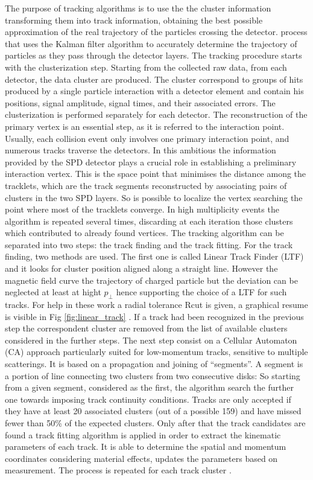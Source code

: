 \documentclass[12pt,a4paper]{book}
\begin{document}
	The purpose of tracking algorithms \cite{Cheng:2908766} is to use the the cluster information transforming them into track information, obtaining the best possible approximation of the real trajectory of the particles crossing the detector. process that uses the Kalman filter algorithm to accurately determine the trajectory of particles as they pass through the detector layers. The tracking procedure starts with the clusterization step. Starting from the collected raw data, from each detector, the data cluster are produced. The cluster correspond to groups of hits produced by a single particle interaction with a detector element and contain his positions, signal amplitude, signal times, and their associated errors. The clusterization is performed separately for each detector. The reconstruction of the primary vertex is an essential step, as it is referred to the interaction point. Usually, each collision event only involves one primary interaction point, and numerous tracks traverse the detectors. In this ambitious the information provided by the SPD detector plays a crucial role in establishing a preliminary interaction vertex. This is the space point that minimises the distance among the tracklets, which are the track segments reconstructed by associating pairs of clusters in the two SPD layers. So is possible to localize the vertex searching  the point where most of the tracklets converge. In high multiplicity events the algorithm is repeated several times, discarding at each iteration those clusters which contributed to already found vertices. The tracking algorithm can be separated into two steps: the track finding and the track fitting. For the track finding, two methods are used. The first one is called Linear Track Finder (LTF) and it looks for cluster position aligned along a straight line. However the magnetic field curve the trajectory of charged particle but the deviation can be neglected at least at hight $p_\perp$ hence supporting the choice of a LTF for such tracks. For help in these work a radial tolerance Rcut is given, a graphical resume is visible in Fig \ref{fig:linear_track} . If a track had been recognized in the previous step the correspondent cluster are removed from the list of available clusters considered in the further steps. The next step consist on a Cellular Automaton (CA) approach particularly suited for low-momentum tracks, sensitive to multiple scatterings. It is based on a propagation and joining of “segments”. A segment is a portion of line connecting two clusters from two consecutive disks: So starting from a given segment, considered as the first, the algorithm search the further one towards imposing track continuity conditions. Tracks are only accepted if they have at least 20 associated clusters (out of a possible 159) and have missed fewer than 50\% of the expected clusters. Only after that the track candidates are found a track fitting algorithm is applied in order to extract the kinematic parameters of each track. It is able to determine the spatial and momentum coordinates considering material effects, updates the parameters based on measurement. The process is repeated for each track cluster \cite{Herrmann:2920632}.
	
\end{document}
